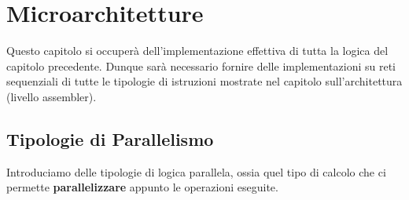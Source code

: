 \documentclass{article}
\begin{document}
\newpage

\section{Microarchitetture}

Questo capitolo si occuperà dell'implementazione effettiva di tutta la logica del capitolo precedente. Dunque sarà necessario fornire delle implementazioni su reti sequenziali di tutte le tipologie di istruzioni mostrate nel capitolo sull'architettura (livello assembler).

\subsection{Tipologie di Parallelismo}

Introduciamo delle tipologie di logica parallela, ossia quel tipo di calcolo che ci permette \textbf{parallelizzare} appunto le operazioni eseguite.

\vspace*{15px}
\end{document}
